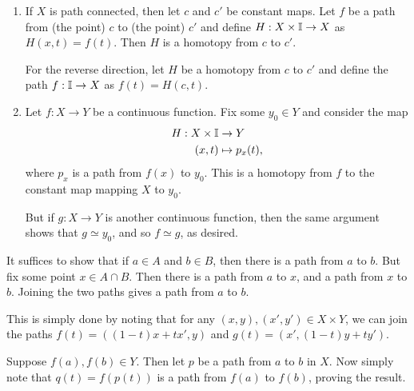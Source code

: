 \documentclass[../solutions.tex]{subfiles}
\begin{document}
\begin{exercise} \leavevmode
\begin{enumerate}
\item If $X$ is path connected, then let $c$ and $c'$ be constant maps. Let $f$ be a path from (the point) $c$ to (the point) $c'$ and define $H:X\times\mathbb I\to X$ as $H(x,t)=f(t)$. Then $H$ is a homotopy from $c$ to $c'$. 

For the reverse direction, let $H$ be a homotopy from $c$ to $c'$ and define the path $f:\mathbb I\to X$ as $f(t)=H(c,t)$. 

\item Let $f:X\to Y$ be a continuous function. Fix some $y_0\in Y$ and consider the map \begin{align*}H:X\times\mathbb I&\to Y\\(x,t)&\mapsto p_x(t),\end{align*} where $p_x$ is a path from $f(x)$ to $y_0$. This is a homotopy from $f$ to the constant map mapping $X$ to $y_0$. 

But if $g:X\to Y$ is another continuous function, then the same argument shows that $g\simeq y_0$, and so $f\simeq g$, as desired. 
\end{enumerate} 
\end{exercise} 

\begin{exercise} \leavevmode
It suffices to show that if $a\in A$ and $b\in B$, then there is a path from $a$ to $b$. But fix some point $x\in A\cap B$. Then there is a path from $a$ to $x$, and a path from $x$ to $b$. Joining the two paths gives a path from $a$ to $b$. 
\end{exercise} 

\begin{exercise} \leavevmode
This is simply done by noting that for any $(x,y),(x',y')\in X\times Y$, we can join the paths $f(t)=((1-t)x+tx',y)$ and $g(t)=(x',(1-t)y+ty')$. 
\end{exercise} 

\begin{exercise} \leavevmode
Suppose $f(a),f(b)\in Y$. Then let $p$ be a path from $a$ to $b$ in $X$. Now simply note that $q(t)=f(p(t))$ is a path from $f(a)$ to $f(b)$, proving the result. 
\end{exercise} 
\end{document}
